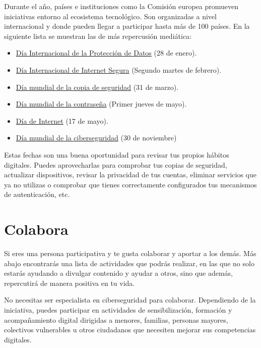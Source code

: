 \documentclass[
  spanish,
  a4paper,
  openany]{book}
\begin{document}
Durante el año, países e instituciones como la Comisión europea promueven iniciativas entorno al ecosistema tecnológico. Son organizadas a nivel internacional y donde pueden llegar a participar hasta más de 100 países. En la siguiente lista se muestran las de más repercusión mediática:

\begin{itemize}
\item
  \href{https://www.coe.int/es/web/portal/28-january-data-protection-day}{Día Internacional de la Protección de Datos} (28 de enero).
\item
  \href{https://es.wikipedia.org/wiki/Día_Internacional_de_Internet_Segura}{Día Internacional de Internet Segura} (Segundo martes de febrero).
\item
  \href{https://www.incibe.es/empresas/blog/dia-mundial-del-backup-repasamos-importancia-las-copias-seguridad}{Día mundial de la copia de seguridad} (31 de marzo).
\item
  \href{https://es.wikipedia.org/wiki/Día_mundial_de_la_contraseña}{Día mundial de la contraseña} (Primer jueves de mayo).
\item
  \href{https://es.wikipedia.org/wiki/Día_de_Internet}{Día de Internet} (17 de mayo).
\item
  \href{https://www.infordisa.com/es/dia-internacional-de-la-seguridad-de-la-informacion/}{Día mundial de la ciberseguridad} (30 de noviembre)
\end{itemize}

Estas fechas son una buena oportunidad para revisar tus propios hábitos digitales. Puedes aprovecharlas para comprobar tus copias de seguridad, actualizar dispositivos, revisar la privacidad de tus cuentas, eliminar servicios que ya no utilizas o comprobar que tienes correctamente configurados tus mecanismos de autenticación, etc.

\section{Colabora}\label{colabora}

Si eres una persona participativa y te gusta colaborar y aportar a los demás. Más abajo encontrarás una lista de actividades que podrás realizar, en las que no solo estarás ayudando a divulgar contenido y ayudar a otros, sino que además, repercutirá de manera positiva en tu vida.

No necesitas ser especialista en ciberseguridad para colaborar. Dependiendo de la iniciativa, puedes participar en actividades de sensibilización, formación y acompañamiento digital dirigidas a menores, familias, personas mayores, colectivos vulnerables u otros ciudadanos que necesiten mejorar sus competencias digitales.
\end{document}
